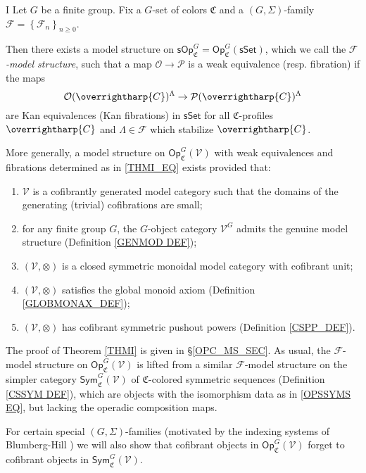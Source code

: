 \documentclass[a4paper,10pt
]{article}%
\numberwithin{equation}{section}
\numberwithin{figure}{section}
\theoremstyle{definition} %
\newcommand{\set}[1]{\left\{#1\right\}}%
\newcommand{\vect}[1]{\text{\overrightharp{\ensuremath{#1}}}}
\newcommand{\Op}{\mathsf{Op}}%
\newcommand{\F}{\ensuremath{\mathcal F}}
\newcommand{\V}{\ensuremath{\mathcal V}}
\renewcommand{\O}{\ensuremath{\mathcal O}}
\newcommand{\1}{\ensuremath{\mathbbm 1}}%
\begin{document}
\begin{customthm}{I}\label{THMI}
Let $G$ be a finite group. Fix a $G$-set of colors $\mathfrak{C}$
and a $(G,\Sigma)$-family $\F = \set{\F_n}_{n \geq 0}$.

Then there exists a model structure on
$\mathsf{sOp}^G_{\mathfrak{C}} =
\mathsf{Op}^G_{\mathfrak{C}}(\mathsf{sSet})$,
which we call the \emph{$\mathcal{F}$-model structure},
such that a map
$\mathcal{O} \to \mathcal{P}$
is a weak equivalence (resp. fibration) if the maps
\begin{equation}\label{THMI_EQ}
	\O(\vect{C})^{\Lambda} \to \mathcal{P}(\vect{C})^{\Lambda}
\end{equation}
are Kan equivalences (Kan fibrations)
in $\mathsf{sSet}$
for all $\mathfrak{C}$-profiles $\vect{C}$
and $\Lambda \in \F$ which stabilize $\vect{C}$.

More generally, a model structure on 
$\Op^G_{\mathfrak C}(\V)$
with weak equivalences and fibrations determined as in 
\eqref{THMI_EQ}
exists provided that:
\begin{enumerate}[label = (\roman*)]
	\item $\V$ is a cofibrantly generated model category
	such that the domains of the generating (trivial) cofibrations are small;
	\item for any finite group $G$, the $G$-object category $\V^G$ admits the genuine model structure (Definition \ref{GENMOD DEF});
	\item $(\V, \otimes)$ is a closed symmetric monoidal model category with cofibrant unit;
	\item $(\V, \otimes)$ satisfies the global monoid axiom (Definition \ref{GLOBMONAX_DEF});
	\item $(\V, \otimes)$ has cofibrant symmetric pushout powers (Definition \ref{CSPP_DEF}).
\end{enumerate}
\end{customthm}


The proof of Theorem \ref{THMI} is given in \S \ref{OPC_MS_SEC}.
As usual, the $\F$-model structure on 
$\Op^G_{\mathfrak C}(\V)$ is lifted from 
a similar $\F$-model structure on the simpler category
$\mathsf{Sym}^G_{\mathfrak C}(\V)$
of $\mathfrak{C}$-colored symmetric sequences
(Definition \ref{CSSYM DEF}),
which are objects with the isomorphism data as in 
\eqref{OPSSYMS EQ}, 
but lacking the operadic composition maps.


For certain special $(G,\Sigma)$-families
(motivated by the indexing systems of Blumberg-Hill \cite{BH15})
we will also show that cofibrant objects in 
$\Op^G_{\mathfrak C}(\V)$
forget to cofibrant objects in 
$\mathsf{Sym}^G_{\mathfrak C}(\V)$.
\end{document}
